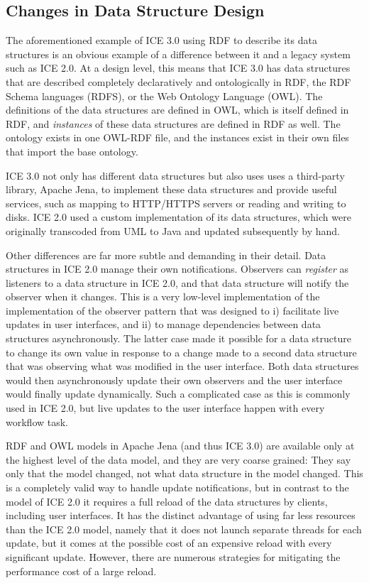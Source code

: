 \subsection{Changes in Data Structure Design}

The aforementioned example of ICE 3.0 using RDF to describe its data structures
is an obvious example of a difference between it and a legacy system such as ICE
2.0. At a design level, this means that ICE 3.0 has data structures that are
described completely declaratively and ontologically in RDF, the RDF Schema
languages (RDFS), or the Web Ontology Language (OWL). The definitions of the
data structures are defined in OWL, which is itself defined in RDF, and
\textit{instances} of these data structures are defined in RDF as well. The
ontology exists in one OWL-RDF file, and the instances exist in their own files
that import the base ontology.

ICE 3.0 not only has different data structures but also uses uses a third-party
library, Apache Jena, to implement these data structures and provide useful
services, such as mapping to HTTP/HTTPS servers or reading and writing to
disks. ICE 2.0 used a custom implementation of its data structures, which were
originally transcoded from UML to Java and updated subsequently by hand.

Other differences are far more subtle and demanding in their detail. Data
structures in ICE 2.0 manage their own notifications. Observers can
\textit{register} as listeners to a data structure in ICE 2.0, and that data
structure will notify the observer when it changes. This is a very low-level
implementation of the implementation of the observer pattern that was designed
to i) facilitate live updates in user interfaces, and ii) to manage dependencies
between data structures asynchronously. The latter case made it possible for a
data structure to change its own value in response to a change made to a second
data structure that was observing what was modified in the user interface. Both
data structures would then asynchronously update their own observers and the
user interface would finally update dynamically. Such a complicated case as
this is commonly used in ICE 2.0, but live updates to the user interface happen
with every workflow task.

RDF and OWL models in Apache Jena (and thus ICE 3.0) are available only at the
highest level of the data model, and they are very coarse grained: They say only
that the model changed, not what data structure in the model changed. This is a
completely valid way to handle update notifications, but in contrast to the
model of ICE 2.0 it requires a full reload of the data structures by clients,
including user interfaces. It has the distinct advantage of using far less
resources than the ICE 2.0 model, namely that it does not launch separate
threads for each update, but it comes at the possible cost of an expensive
reload with every significant update. However, there are numerous strategies
for mitigating the performance cost of a large reload.

